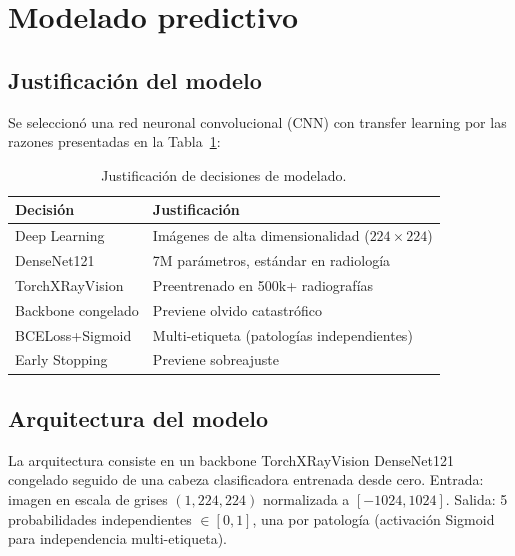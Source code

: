 \section{Modelado predictivo}
\label{sec:modeling}

\subsection{Justificaci\'on del modelo}

Se seleccion\'o una red neuronal convolucional (CNN) con transfer learning por las razones presentadas en la Tabla~\ref{tab:justification}:

\begin{table}[H]
\centering
\caption{Justificaci\'on de decisiones de modelado.}
\label{tab:justification}
\small
\begin{tabular}{lp{4cm}}
\toprule
\textbf{Decisi\'on} & \textbf{Justificaci\'on} \\
\midrule
Deep Learning    & Im\'agenes de alta dimensionalidad ($224{\times}224$) \\
DenseNet121      & 7M par\'ametros, est\'andar en radiolog\'ia \cite{huang2017densenet} \\
TorchXRayVision  & Preentrenado en 500k+ radiograf\'ias \cite{cohen2022torchxrayvision} \\
Backbone congelado & Previene olvido catastr\'ofico \\
BCELoss+Sigmoid  & Multi-etiqueta (patolog\'ias independientes) \\
Early Stopping   & Previene sobreajuste \cite{prechelt1998early} \\
\bottomrule
\end{tabular}
\end{table}

\subsection{Arquitectura del modelo}

La arquitectura consiste en un backbone TorchXRayVision DenseNet121 congelado seguido de una cabeza clasificadora entrenada desde cero. Entrada: imagen en escala de grises $(1, 224, 224)$ normalizada a $[-1024, 1024]$. Salida: 5 probabilidades independientes $\in [0, 1]$, una por patolog\'ia (activaci\'on Sigmoid para independencia multi-etiqueta).

